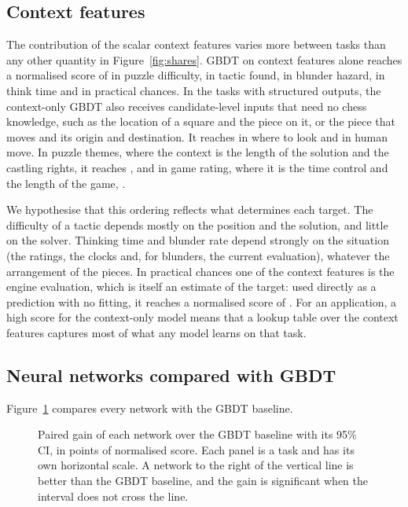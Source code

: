 \documentclass[11pt]{article}
\begin{document}
\subsection{Context features}
\label{sec:context}

The contribution of the scalar context features varies more between tasks
than any other quantity in Figure~\ref{fig:shares}. GBDT on context features
alone reaches a normalised score of
 in puzzle difficulty,
 in tactic found,
 in blunder hazard,
 in think time and
 in practical chances. In the tasks
with structured outputs, the context-only GBDT also receives candidate-level
inputs that need no chess knowledge, such as the location of a square and the
piece on it, or the piece that moves and its origin and destination. It
reaches  in where to look and
 in human move. In puzzle themes,
where the context is the length of the solution and the castling rights, it
reaches , and in game rating,
where it is the time control and the length of the game,
.

We hypothesise that this ordering reflects what determines each target. The
difficulty of a tactic depends mostly on the position and the solution, and
little on the solver. Thinking time and blunder rate depend strongly on the
situation (the ratings, the clocks and, for blunders, the current
evaluation), whatever the arrangement of the pieces. In practical chances one
of the
context features is the engine evaluation, which is itself an estimate of the
target: used directly as a prediction with no fitting, it reaches a
normalised score of . For an
application, a high score for the context-only model means that a lookup
table over the context features captures most of what any model learns on
that task.

\subsection{Neural networks compared with GBDT}
\label{sec:networks}

Figure~\ref{fig:networks} compares every network with the GBDT baseline.

\begin{figure}[htbp]\centering
{}
\caption{Paired gain of each network over the GBDT baseline with its 95\%
CI, in points of normalised score. Each panel is a task and has its own
horizontal scale. A network to the right of the vertical line is better than
the GBDT baseline, and the gain is significant when the interval does not
cross the line.}
\label{fig:networks}
\end{figure}
\end{document}
